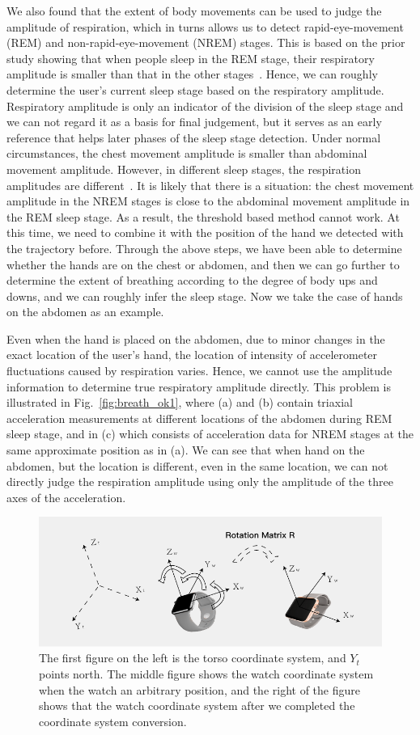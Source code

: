 We also found that the extent of body movements can be used to judge the amplitude of respiration, which in turns allows us to detect
rapid-eye-movement (REM) and non-rapid-eye-movement (NREM) stages. This is based on the prior study showing that when people sleep in the
REM stage, their respiratory amplitude is smaller than that in the other stages~\cite{respiratory1982}. Hence, we can roughly determine the
user's current sleep stage based on the respiratory amplitude. Respiratory amplitude is only an indicator of the division of the sleep
stage and we can not regard it as a basis for final judgement, but it serves as an early reference that helps later phases of the sleep
stage detection. Under normal circumstances, the chest movement amplitude is smaller than abdominal movement amplitude. However, in
different sleep stages, the respiration amplitudes are different~\cite{respiratory}. It is likely that there is a situation: the chest
movement amplitude in the NREM stages is close to the abdominal movement amplitude in the REM sleep stage. As a result, the threshold based
method cannot work. At this time, we need to combine it with the position of the hand we detected with the trajectory before. Through the
above steps, we have been able to determine whether the hands are on the chest or abdomen, and then we can go further to determine the
extent of breathing according to the degree of body ups and downs, and we can roughly infer the sleep stage. Now we take the case of hands
on the abdomen as an example.



    Even when the hand is placed on the abdomen, due to minor changes in the exact location of the user's hand, the location of intensity of
accelerometer fluctuations caused by respiration varies. Hence, we cannot use the amplitude information to determine true respiratory
amplitude directly. This problem is illustrated in Fig.~\ref{fig:breath_ok1}, where (a) and (b) contain triaxial acceleration measurements
at different locations of the abdomen during REM sleep stage, and in (c) which consists of acceleration data for NREM stages at the same
approximate position as in (a). We can see that when hand on the abdomen, but the location is different, even in the same location, we can
not directly judge the respiration amplitude using only the amplitude of the three axes of the acceleration.

\begin{figure}[!t]
\centering
      \includegraphics[width=0.67\linewidth]{Figures/watch.pdf}
  \caption{The first figure on the left is the torso coordinate system, and $Y_t$ points north. The middle figure shows the watch coordinate system when the watch an arbitrary position, and the right of the figure shows that the  watch coordinate system after we completed the coordinate system conversion.}\label{fig:watch}
\end{figure}

